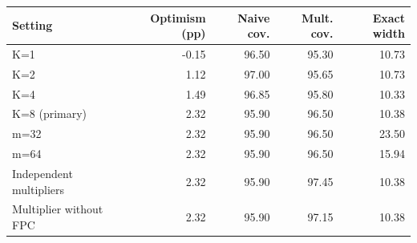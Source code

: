 \begin{tabular}{lrrrr}
\toprule
Setting & Optimism (pp) & Naive cov. & Mult. cov. & Exact width \\
\midrule
K=1 & -0.15 & 96.50 & 95.30 & 10.73 \\
K=2 & 1.12 & 97.00 & 95.65 & 10.73 \\
K=4 & 1.49 & 96.85 & 95.80 & 10.33 \\
K=8 (primary) & 2.32 & 95.90 & 96.50 & 10.38 \\
m=32 & 2.32 & 95.90 & 96.50 & 23.50 \\
m=64 & 2.32 & 95.90 & 96.50 & 15.94 \\
Independent multipliers & 2.32 & 95.90 & 97.45 & 10.38 \\
Multiplier without FPC & 2.32 & 95.90 & 97.15 & 10.38 \\
\bottomrule
\end{tabular}